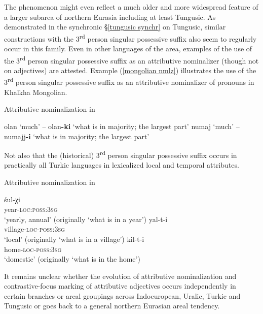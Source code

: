 The phenomenon might even reflect a much older and more widespread feature of a larger subarea of northern Eurasia including at least Tungusic. As demonstrated in the synchronic \S\ref{tungusic synchr} on Tungusic, similar constructions with the 3\textsuperscript{rd} person singular possessive suffix also seem to regularly occur in this family. Even in other languages of the area, examples of the use of the 3\textsuperscript{rd} person singular possessive suffix as an attributive nominalizer (though not on adjectives) are attested. Example (\ref{mongolian nmlz}) illustrates the use of the 3\textsuperscript{rd} person singular possessive suffix as an attributive nominalizer of pronouns in Khalkha Mongolian.
\begin{exe} \label{mongolian nmlz}
\ex Attributive nominalization in \\
\begin{xlist}
\ex	olan ‘much’ – olan\textbf{-ki} ‘what is in majority; the largest part’
\ex	numaj ‘much’ – numajj\textbf{-i} ‘what is in majority; the largest part’
\end{xlist}
\end{exe}
Not also that the (historical) 3\textsuperscript{rd} person singular possessive suffix occurs in practically all Turkic languages in lexicalized local and temporal attributes. 
\begin{exe}
\ex Attributive nominalization in \\
\begin{xlist}
\ex
\gll	śul-χi\\
	year-\textsc{loc:poss:3sg}\\
\glt	‘yearly, annual’ (originally ‘what is in a year’)
\ex
\gll	yal-t-i\\
	village-\textsc{loc-poss:3sg}\\
\glt	‘local’ (originally ‘what is in a village’)
\ex
\gll	kil-t-i\\
	home-\textsc{loc-poss:3sg}\\
\glt	‘domestic’ (originally ‘what is in the home’)
\end{xlist}
\end{exe}
It remains unclear whether the evolution of attributive nominalization and contrastive-focus marking of attributive adjectives occurs independently in certain branches or areal groupings across Indoeuropean, Uralic, Turkic and Tungusic or goes back to a general northern Eurasian areal tendency.

